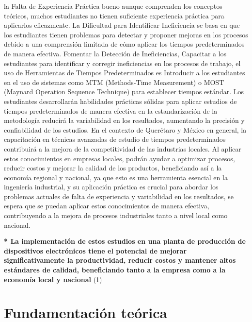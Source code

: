 \begin{itemize}
    la Falta de Experiencia Práctica bueno aunque comprenden los conceptos teóricos, muchos estudiantes no tienen suficiente experiencia práctica para aplicarlos eficazmente.
    La Dificultad para Identificar Ineficiencia se basa en que los estudiantes tienen problemas para detectar y proponer mejoras en los procesos debido a una comprensión limitada de cómo aplicar los tiempos predeterminados de manera efectiva.
    Fomentar la Detección de Ineficiencias, Capacitar a los estudiantes para identificar y corregir ineficiencias en los procesos de trabajo, el uso de Herramientas de Tiempos Predeterminados es Introducir a los estudiantes en el uso de sistemas como MTM (Methods-Time Measurement) o MOST (Maynard Operation Sequence Technique) para establecer tiempos estándar.
    Los estudiantes desarrollarán habilidades prácticas sólidas para aplicar estudios de tiempos predeterminados de manera efectiva en la estandarización de la metodología reducirá la variabilidad en los resultados, aumentando la precisión y confiabilidad de los estudios.
    En el contexto de Querétaro y México en general, la capacitación en técnicas avanzadas de estudio de tiempos predeterminados contribuirá a la mejora de la competitividad de las industrias locales. Al aplicar estos conocimientos en empresas locales, podrán ayudar a optimizar procesos, reducir costos y mejorar la calidad de los productos, beneficiando así a la economía regional y nacional, ya que esto es una herramienta esencial en la ingeniería industrial, y su aplicación práctica es crucial para abordar los problemas actuales de falta de experiencia y variabilidad en los resultados, se espera que se puedan aplicar estos conocimientos de manera efectiva, contribuyendo a la mejora de procesos industriales tanto a nivel local como nacional.\cite{Niebel}
    
    \end{itemize}
    
    \textbf{* La implementación de estos estudios en una planta de producción de dispositivos electrónicos tiene el potencial de mejorar significativamente la productividad, reducir costos y mantener altos estándares de calidad, beneficiando tanto a la empresa como a la economía local y nacional} (1) 
    
    \section{Fundamentación teórica}
    
